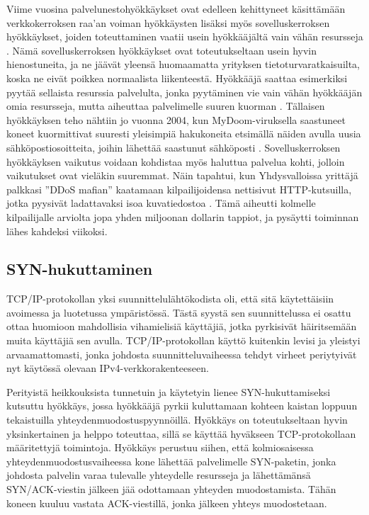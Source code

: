 Viime vuosina palvelunestohyökkäykset ovat edelleen kehittyneet
käsittämään verkkokerroksen raa’an voiman hyökkäysten lisäksi myös
sovelluskerroksen hyökkäykset, joiden toteuttaminen vaatii usein
hyökkääjältä vain vähän resursseja \cite{hacking}. Nämä sovelluskerroksen
hyökkäykset ovat toteutukseltaan usein hyvin hienostuneita, ja ne
jäävät yleensä huomaamatta yrityksen tietoturvaratkaisuilta, koska ne
eivät poikkea normaalista liikenteestä. Hyökkääjä saattaa esimerkiksi
pyytää sellaista resurssia palvelulta, jonka pyytäminen vie vain vähän
hyökkääjän omia resursseja, mutta aiheuttaa palvelimelle suuren
kuorman \cite{ddos}. Tällaisen hyökkäyksen teho nähtiin jo vuonna 2004, kun
MyDoom-viruksella saastuneet koneet kuormittivat suuresti yleisimpiä
hakukoneita etsimällä näiden avulla uusia sähköpostiosoitteita, joihin
lähettää saastunut sähköposti \cite{hacking}. Sovelluskerroksen hyökkäyksen
vaikutus voidaan kohdistaa myös haluttua palvelua kohti, jolloin
vaikutukset ovat vieläkin suuremmat. Näin tapahtui, kun Yhdysvalloissa
yrittäjä palkkasi ”DDoS mafian” kaatamaan kilpailijoidensa nettisivut
HTTP-kutsuilla, jotka pyysivät ladattavaksi isoa kuvatiedostoa
\cite{ddos}. Tämä aiheutti kolmelle kilpailijalle arviolta jopa yhden
miljoonan dollarin tappiot, ja pysäytti toiminnan lähes kahdeksi
viikoksi\cite{fbi}.

\subsection{SYN-hukuttaminen}

TCP/IP-protokollan yksi suunnittelulähtökodista oli, että sitä
käytettäisiin avoimessa ja luotetussa ympäristössä. Tästä syystä sen
suunnittelussa ei osattu ottaa huomioon mahdollisia vihamielisiä
käyttäjiä, jotka pyrkisivät häiritsemään muita käyttäjiä sen
avulla. TCP/IP-protokollan käyttö kuitenkin levisi ja yleistyi
arvaamattomasti, jonka johdosta suunnitteluvaiheessa tehdyt virheet
periytyivät nyt käytössä olevaan IPv4-verkkorakenteeseen\cite{hacking}.

Perityistä heikkouksista tunnetuin ja käytetyin lienee
SYN-hukuttamiseksi kutsuttu hyökkäys, jossa hyökkääjä pyrkii
kuluttamaan kohteen kaistan loppuun tekaistuilla
yhteydenmuodostuspyynnöillä. Hyökkäys on toteutukseltaan hyvin
yksinkertainen ja helppo toteuttaa, sillä se käyttää hyväkseen
TCP-protokollaan määritettyjä toimintoja. Hyökkäys perustuu siihen,
että kolmiosaisessa yhteydenmuodostusvaiheessa kone lähettää
palvelimelle SYN-paketin, jonka johdosta palvelin varaa tulevalle
yhteydelle resursseja ja lähettämänsä SYN/ACK-viestin jälkeen jää
odottamaan yhteyden muodostamista. Tähän koneen kuuluu vastata
ACK-viestillä, jonka jälkeen yhteys muodostetaan\cite{hacking}.

